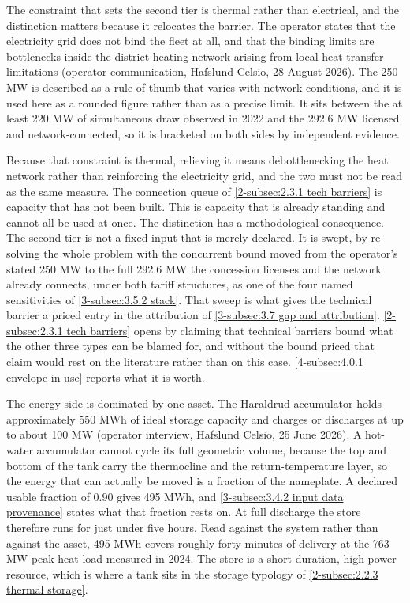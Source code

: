 The constraint that sets the second tier is thermal rather than electrical, and the distinction matters because it relocates the barrier. The operator states that the electricity grid does not bind the fleet at all, and that the binding limits are bottlenecks inside the district heating network arising from local heat-transfer limitations (operator communication, Hafslund Celsio, 28 August 2026). The 250 MW is described as a rule of thumb that varies with network conditions, and it is used here as a rounded figure rather than as a precise limit. It sits between the at least 220 MW of simultaneous draw observed in 2022 \cite{Thema_fjernvarme_2024} and the 292.6 MW licensed and network-connected, so it is bracketed on both sides by independent evidence.

Because that constraint is thermal, relieving it means debottlenecking the heat network rather than reinforcing the electricity grid, and the two must not be read as the same measure. The connection queue of \autoref{2-subsec:2.3.1 tech barriers} is capacity that has not been built. This is capacity that is already standing and cannot all be used at once. The distinction has a methodological consequence. The second tier is not a fixed input that is merely declared. It is swept, by re-solving the whole problem with the concurrent bound moved from the operator's stated 250 MW to the full 292.6 MW the concession licenses and the network already connects, under both tariff structures, as one of the four named sensitivities of \autoref{3-subsec:3.5.2 stack}. That sweep is what gives the technical barrier a priced entry in the attribution of \autoref{3-subsec:3.7 gap and attribution}. \autoref{2-subsec:2.3.1 tech barriers} opens by claiming that technical barriers bound what the other three types can be blamed for, and without the bound priced that claim would rest on the literature rather than on this case. \autoref{4-subsec:4.0.1 envelope in use} reports what it is worth.

The energy side is dominated by one asset. The Haraldrud accumulator holds approximately 550 MWh of ideal storage capacity and charges or discharges at up to about 100 MW (operator interview, Hafslund Celsio, 25 June 2026). A hot-water accumulator cannot cycle its full geometric volume, because the top and bottom of the tank carry the thermocline and the return-temperature layer, so the energy that can actually be moved is a fraction of the nameplate. A declared usable fraction of $0.90$ gives 495 MWh, and \autoref{3-subsec:3.4.2 input data provenance} states what that fraction rests on. At full discharge the store therefore runs for just under five hours. Read against the system rather than against the asset, 495 MWh covers roughly forty minutes of delivery at the 763 MW peak heat load measured in 2024. The store is a short-duration, high-power resource, which is where a tank sits in the storage typology of \autoref{2-subsec:2.2.3 thermal storage}.

